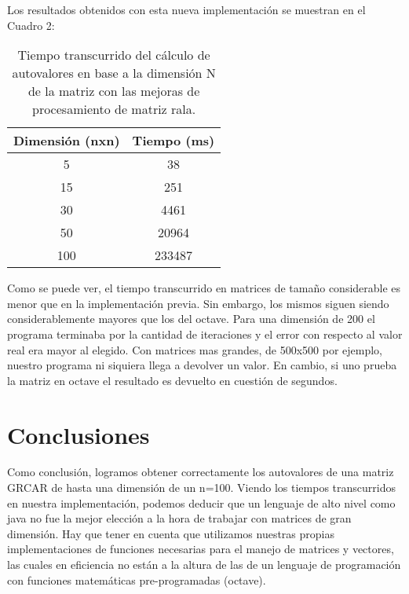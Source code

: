\documentclass[a4paper,10pt]{article}
\begin{document}
Los resultados obtenidos con esta nueva implementación se muestran en el Cuadro 2:
 
\begin{center}
\begin{table}[!htbp]
\centering
\begin{tabular}{cc}
\hline
\textbf{Dimensión (nxn)} & \textbf{Tiempo (ms)} \\ \hline
5                  & 38                \\
15                 & 251                \\
30                 & 4461                 \\
50                 & 20964                \\
100                & 233487                         
\end{tabular}
\caption[Texto del índice (opcional)]{Tiempo transcurrido del cálculo de autovalores en base a la dimensión N de la matriz con las mejoras de procesamiento de matriz rala.}
\end{table}
\end{center}


Como se puede ver, el tiempo transcurrido en matrices de tamaño considerable es menor que en la implementación previa. Sin embargo, los mismos siguen siendo considerablemente mayores que los del octave. Para una dimensión de 200 el programa terminaba por la cantidad de iteraciones y el error con respecto al valor real era mayor al elegido. Con matrices mas grandes, de 500x500 por ejemplo, nuestro programa ni siquiera llega a devolver un valor. En cambio, si uno prueba la matriz en octave el resultado es devuelto en cuestión de segundos.


\section{Conclusiones}
Como conclusión, logramos obtener correctamente los autovalores de una matriz GRCAR de hasta una dimensión de un n=100. Viendo los tiempos transcurridos en nuestra implementación, podemos deducir que un lenguaje de alto nivel como java no fue la mejor elección a la hora de trabajar con matrices de gran dimensión. Hay que tener en cuenta que utilizamos nuestras propias implementaciones de funciones necesarias para el manejo de matrices y vectores, las cuales en eficiencia no están a la altura de las de un lenguaje de programación con funciones matemáticas pre-programadas (octave).

\pagebreak
\end{document}
